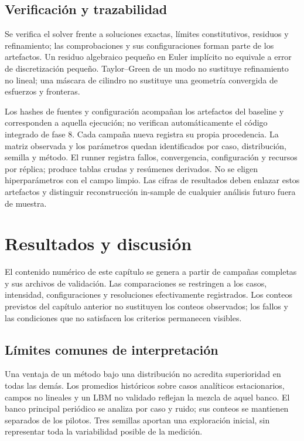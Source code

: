 \documentclass[11pt,oneside,openany]{book}
\begin{document}
\section{Verificación y trazabilidad}
Se verifica el solver frente a soluciones exactas, límites constitutivos,
residuos y refinamiento; las comprobaciones y sus configuraciones forman
parte de los artefactos. Un residuo algebraico pequeño en Euler implícito
no equivale a error de discretización pequeño. Taylor--Green de un modo
no sustituye refinamiento no lineal; una máscara de cilindro no sustituye
una geometría convergida de esfuerzos y fronteras.

Los hashes de fuentes y configuración acompañan los artefactos del baseline y corresponden a aquella ejecución; no verifican automáticamente el código integrado de fase 8. Cada campaña nueva registra su propia procedencia. La matriz observada y los parámetros quedan identificados por caso,
distribución, semilla y método. El runner registra fallos, convergencia,
configuración y recursos por réplica; produce tablas crudas y resúmenes
derivados. No se eligen hiperparámetros con el campo limpio. Las cifras
de resultados deben enlazar estos artefactos y distinguir reconstrucción
in-sample de cualquier análisis futuro fuera de muestra.

\chapter{Resultados y discusión}
\label{chap:results}
El contenido numérico de este capítulo se genera a partir de campañas
completas y sus archivos de validación. Las comparaciones se restringen a los
casos, intensidad, configuraciones y resoluciones efectivamente
registrados. Los conteos previstos del capítulo anterior no sustituyen
los conteos observados; los fallos y las condiciones que no satisfacen
los criterios permanecen visibles.



\section{Límites comunes de interpretación}
Una ventaja de un método bajo una distribución no acredita superioridad
en todas las demás. Los promedios históricos sobre casos analíticos
estacionarios, campos no lineales y un LBM no validado reflejan la mezcla
de aquel banco. El banco principal periódico se analiza por caso y ruido;
sus conteos se mantienen separados de los pilotos.
Tres semillas aportan una exploración inicial, sin representar toda la
variabilidad posible de la medición.
\end{document}
